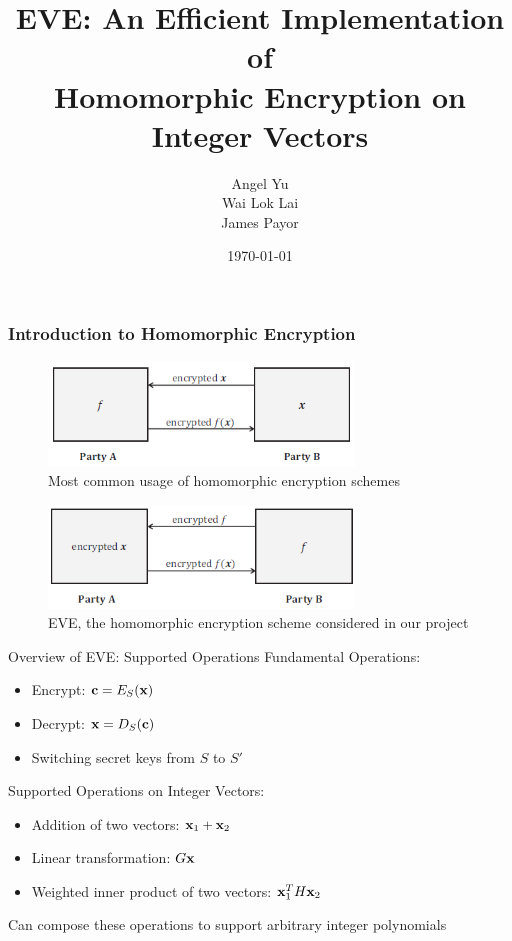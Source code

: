\documentclass{beamer}
\title[EVE: Efficient Vector Encryption]{EVE: An Efficient Implementation of \\ 
Homomorphic Encryption on Integer Vectors}
\author[Yu, Lai, Payor]{Angel Yu \\ Wai Lok Lai \\ James Payor}
\institute[MIT]
{
}
\date{\today}
\newcommand{\itz}[1]{\begin{itemize}#1\end{itemize}} %
\newcommand{\bbc}{{\bf c}} %
\newcommand{\bbx}{{\bf x}} %
\begin{document}
\begin{frame}
\titlepage
\end{frame}






\begin{frame}
\frametitle{Introduction to Homomorphic Encryption}

\begin{figure}[ht]
\centering
\includegraphics[width=3.2in]{he}
\caption{Most common usage of homomorphic encryption schemes}
\end{figure}

\begin{figure}[ht]
\centering
\includegraphics[width=3.2in]{eve}
\caption{EVE, the homomorphic encryption scheme considered in our project}
\end{figure}
\end{frame}





\begin{frame}{Overview of EVE: Supported Operations}
Fundamental Operations: 
\itz{
\item{Encrypt: $\bbc = E_S(\bbx)$}
\item{Decrypt: $\bbx = D_S(\bbc)$}
\item{Switching secret keys from $S$ to $S'$}
}
\vspace{.15in}
Supported Operations on Integer Vectors: 
\itz{
\item{Addition of two vectors: $\bbx_1 + \bbx_2$}
\item{Linear transformation: $G\bbx$}
\item{Weighted inner product of two vectors: $\bbx_1^T H \bbx_2$}
}
\vspace{.15in}
Can compose these operations to support arbitrary integer polynomials
\end{frame}
\end{document}
